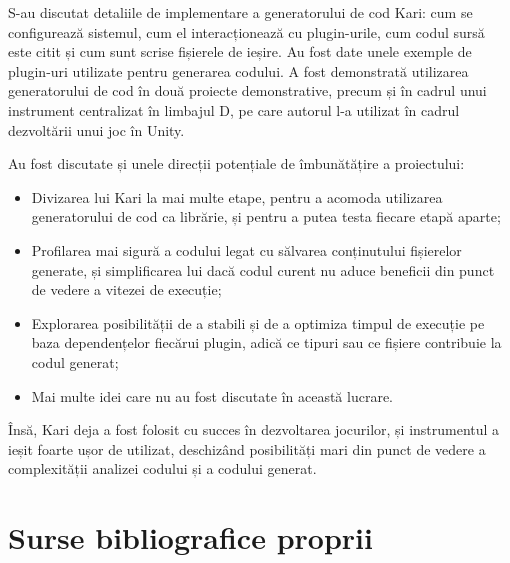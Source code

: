 \documentclass[a4paper,12pt]{report}
\begin{document}
S-au discutat detaliile de implementare a generatorului de cod Kari: cum se configurează sistemul, cum el interacționează cu plugin-urile, cum codul sursă este citit și cum sunt scrise fișierele de ieșire.
Au fost date unele exemple de plugin-uri utilizate pentru generarea codului.
A fost demonstrată utilizarea generatorului de cod în două proiecte demonstrative, precum și în cadrul unui instrument centralizat în limbajul D, pe care autorul l-a utilizat în cadrul dezvoltării unui joc în Unity.

Au fost discutate și unele direcții potențiale de îmbunătățire a proiectului:

\begin{itemize}
  \item Divizarea lui Kari la mai multe etape, pentru a acomoda utilizarea generatorului de cod ca librărie, și pentru a putea testa fiecare etapă aparte;
  \item Profilarea mai sigură a codului legat cu sălvarea conținutului fișierelor generate, și simplificarea lui dacă codul curent nu aduce beneficii din punct de vedere a vitezei de execuție;
  \item Explorarea posibilității de a stabili și de a optimiza timpul de execuție pe baza dependențelor fiecărui plugin, adică ce tipuri sau ce fișiere contribuie la codul generat;
  \item Mai multe idei care nu au fost discutate în această lucrare.
\end{itemize}

Însă, Kari deja a fost folosit cu succes în dezvoltarea jocurilor, și instrumentul a ieșit foarte ușor de utilizat, deschizând posibilități mari din punct de vedere a complexității analizei codului și a codului generat.

\newpage
{}




%
\section*{Surse bibliografice proprii}
\end{document}
